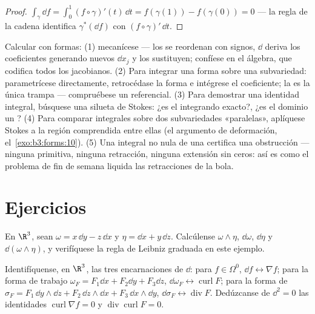 \begin{proof}
$\int_\gamma\dd f = \int_0^1(f\circ\gamma)'(t)\,\dd t =
f(\gamma(1)) - f(\gamma(0)) = 0$ --- la regla de la cadena identifica
$\gamma^*(\dd f)$ con $(f\circ\gamma)'\,\dd t$.
\end{proof}

\begin{method}\label{met:b3:forms:method}
Calcular con formas: (1) mecanícese --- los  se
reordenan con signos, $\dd$ deriva los coeficientes generando nuevos
$\dd
x_j$ y los  sustituyen;
confíese en el álgebra, que codifica todos los jacobianos. (2) Para
integrar una forma sobre una subvariedad: parametrícese directamente,
retrocédase la forma e intégrese el coeficiente; la
 es la única trampa ---
compruébese un referencial. (3) Para demostrar una identidad integral,
búsquese una silueta de Stokes: ¿es el integrando
exacto?, ¿es el dominio un
? (4) Para comparar integrales
sobre dos subvariedades «paralelas», aplíquese Stokes a la región
comprendida entre ellas (el argumento de deformación,
el~\cref{exo:b3:forms:10}). (5) Una integral no nula de una
 certifica una
obstrucción  --- ninguna
primitiva, ninguna retracción, ninguna extensión sin ceros: así es como
el problema de fin de semana liquida las retracciones de la bola.
\end{method}

\section{Ejercicios}

\begin{exercise}[$\star$]\label{exo:b3:forms:1}
En $\R^3$, sean $\omega = x\,\dd y - z\,\dd x$ y $\eta =
\dd x + y\,\dd z$. Calcúlense $\omega\wedge\eta$, $\dd\omega$, $\dd\eta$
y $\dd(\omega\wedge\eta)$, y verifíquese la regla de Leibniz graduada en
este ejemplo.
\end{exercise}

\begin{exercise}[$\star$]\label{exo:b3:forms:2}
Identifíquense, en $\R^3$, las tres encarnaciones de $\dd$: para
$f \in \Omega^0$, $\dd f \leftrightarrow \nabla f$; para la forma de
trabajo $\omega_F = F_1\dd x + F_2\dd y + F_3\dd z$,
$\dd\omega_F \leftrightarrow \operatorname{curl}F$; para la forma de
 $\sigma_F = F_1\,\dd y\wedge\dd z + F_2\,\dd
z\wedge\dd x + F_3\,\dd x\wedge\dd y$, $\dd\sigma_F
\leftrightarrow \operatorname{div}F$. Dedúzcanse de $\dd^2 =
0$ las identidades $\operatorname{curl}\nabla f = 0$ y
$\operatorname{div}\operatorname{curl}F = 0$.
\end{exercise}

